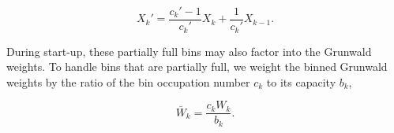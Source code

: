\begin{equation}
X_k\prime = \frac{c_k\prime-1}{c_k\prime}X_k + \frac{1}{c_k\prime}X_{k-1}.
\label{avgShiftReg}
\end{equation}

During start-up, these partially full bins may also factor into the Grunwald weights. To handle bins that are partially full, we weight the binned Grunwald weights by the ratio of the bin occupation number $c_k$ to its capacity $b_k$, 

\begin{equation}
\bar{W}_k= \frac{c_k W_k}{b_k}.
\label{Wbar}
\end{equation} 










